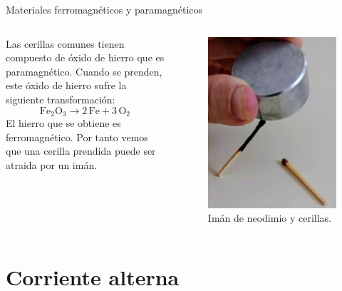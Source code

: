 \documentclass[]{presentation}
\begin{document}
\begin{frame}{Materiales ferromagnéticos y paramagnéticos}
\begin{columns}
	Las cerillas comunes tienen compuesto de óxido de hierro que es paramagnético.
	Cuando se prenden, este óxido de hierro sufre la siguiente transformación:
	$$
		\text{Fe}_2\text{O}_3 \rightarrow 2 \, \text{Fe} + 3 \, \text{O}_2
	$$
	El hierro que se obtiene es ferromagnético. Por tanto vemos que una cerilla prendida puede ser atraida por un imán.
	\begin{figure}
		\centering
		\includegraphics[width=1\linewidth]{fig/experimentos/iman_y_cerillas}
		\caption{Imán de neodimio y cerillas.}
	\end{figure}
\end{columns}
\end{frame}


\section{Corriente alterna}
\end{document}
